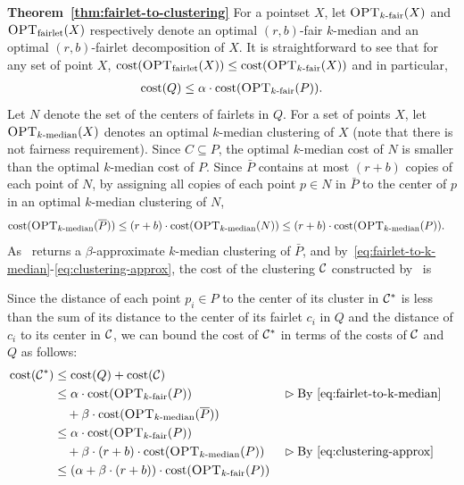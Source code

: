 \begin{proofof}{\bf Theorem~\ref{thm:fairlet-to-clustering}}
For a pointset $X$, let $\textsc{OPT}_{k\text{-fair}}(X)$ and $\textsc{OPT}_{\text{fairlet}}(X)$ respectively denote an optimal $(r,b)$-fair $k$-median and an optimal $(r,b)$-fairlet decomposition of $X$. It is straightforward to see that for any set of point $X$, $\mathrm{cost}(\textsc{OPT}_{\text{fairlet}}(X)) \leq \mathrm{cost}(\textsc{OPT}_{k\text{-fair}}(X))$ and in particular,
\begin{align}\label{eq:fairlet-to-k-median}
\mathrm{cost}(Q) \leq \alpha \cdot \mathrm{cost}(\textsc{OPT}_{k\text{-fair}}(P)).
\end{align}
Let $N$ denote the set of the centers of fairlets in $Q$. For a set of points $X$, let $\textsc{OPT}_{k\text{-median}}(X)$ denotes an optimal $k$-median clustering of $X$ (note that there is not fairness requirement). Since $C\subseteq P$, the optimal $k$-median cost of $N$ is smaller than the optimal $k$-median cost of $P$. Since $\bar{P}$ contains at most $(r+b)$ copies of each point of $N$, by assigning all copies of each point $p\in N$ in $\bar{P}$ to the center of $p$ in an optimal $k$-median clustering of $N$,   
\begin{align}
\mathrm{cost}(\textsc{OPT}_{k\text{-median}}(\overline{P})) &\leq (r+b) \cdot \mathrm{cost}(\textsc{OPT}_{k\text{-median}}({N})) \leq (r+b) \cdot \mathrm{cost}(\textsc{OPT}_{k\text{-median}}({P})).\label{eq:clustering-approx}
\end{align}
As \Call{\clusterFairlet}\ returns a $\beta$-approximate $k$-median clustering of $\bar{P}$, and by~\eqref{eq:fairlet-to-k-median}-\eqref{eq:clustering-approx}, the cost of the clustering $\mathcal{C}$ constructed by \Call{\clusterFairlet}\ is  

Since the distance of each point $p_i \in P$ to the center of its cluster in $\mathcal{C}^*$ is less than the sum of its distance to the center of its fairlet $c_i$ in $Q$ and the distance of $c_i$ to its center in $\mathcal{C}$, we can bound the cost of $\mathcal{C}^*$ in terms of the costs of $\mathcal{C}$ and $Q$ as follows:
\begin{align*}
\mathrm{cost}(\mathcal{C}^*) &\leq \mathrm{cost}(Q) + \mathrm{cost}(\mathcal{C})\\
&\leq \alpha \cdot \mathrm{cost}(\textsc{OPT}_{k\text{-fair}}(P)) &&\rhd \text{By~\eqref{eq:fairlet-to-k-median}} \\ 
&\quad +\beta \cdot \mathrm{cost}(\textsc{OPT}_{k\text{-median}}(\overline{P}))\\
&\leq \alpha \cdot \mathrm{cost}(\textsc{OPT}_{k\text{-fair}}(P)) \\ 
&\quad + \beta \cdot (r+b) \cdot \mathrm{cost}(\textsc{OPT}_{k\text{-median}}({P})) &&\rhd \text{By~\eqref{eq:clustering-approx}} \\
&\leq (\alpha + \beta\cdot (r+b)) \cdot  \mathrm{cost}(\textsc{OPT}_{k\text{-fair}}(P))
\end{align*}
\end{proofof}